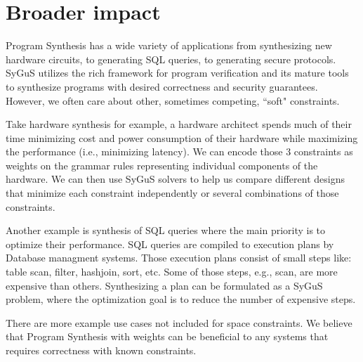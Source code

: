 \section{Broader impact}
\label{sec:impact}
Program Synthesis has a wide variety of applications from synthesizing new hardware circuits, to generating SQL queries, to generating secure protocols.
%
SyGuS utilizes the rich framework for program verification and its mature tools to synthesize programs with desired correctness and security guarantees.
%
However, we often care about other, sometimes competing, ``soft" constraints.
%

Take hardware synthesis for example, a hardware architect spends much of their time minimizing cost and power consumption of their hardware while maximizing the performance (i.e., minimizing latency).
%
We can encode those 3 constraints as weights on the grammar rules representing individual components of the hardware.
%
We can then use SyGuS solvers to help us compare different designs that minimize each constraint independently or several combinations of those constraints.
%

Another example is synthesis of SQL queries where the main priority is to optimize their performance.
%
SQL queries are compiled to execution plans by Database managment systems.
%
Those execution plans consist of small steps like: table scan, filter, hashjoin, sort, etc.
%
Some of those steps, e.g., scan, are more expensive than others.
%
Synthesizing a plan can be formulated as a SyGuS problem, where the optimization goal is to reduce the number of expensive steps.
%

There are more example use cases not included for space constraints. We believe that Program Synthesis with weights can be beneficial to any systems that requires correctness with known constraints.
